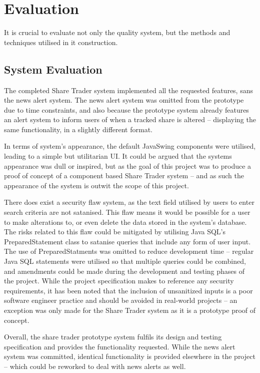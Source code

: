 \documentclass[12pt, a4paper,titlepage]{article}
\begin{document}
\section{Evaluation}
It is crucial to evaluate not only the quality system, but the methods and
techniques utilised in it construction.

\subsection{System Evaluation}
The completed Share Trader system implemented all the requested features, sans
the news alert system. The news alert system was omitted from the prototype
due to time constraints, and also because the prototype system already
features an alert system to inform users of when a tracked share is altered –
displaying the same functionality, in a slightly different format.

In terms of system’s appearance, the default JavaSwing components were
utilised, leading to a simple but utilitarian UI. It could be argued that the
systems appearance was dull or inspired, but as the goal of this project was
to produce a proof of concept of a component based Share Trader system – and
as such the appearance of the system is outwit the scope of this project.

There does exist a security flaw system, as the text field utilised by users
to enter search criteria are not satanised. This flaw means it would be
possible for a user to make alterations to, or even delete the data stored in
the system’s database. The risks related to this flaw could be mitigated by
utilising Java SQL’s PreparedStatement class to satanise queries that include
any form of user input. The use of PreparedStatments was omitted to reduce
development time – regular Java SQL statements were utilised so that multiple
queries could be combined, and amendments could be made during the development
and testing phases of the project.  While the project specification makes to
reference any security requirements, it has been noted that the inclusion of
unsanitized inputs is a poor software engineer practice and should be avoided
in real-world projects – an exception was only made for the Share Trader
system as it is a prototype proof of concept.

Overall, the share trader prototype system fulfils its design and testing
specification and provides the functionality requested. While the news alert
system was committed, identical functionality is provided elsewhere in the
project – which could be reworked to deal with news alerts as well.
\end{document}
